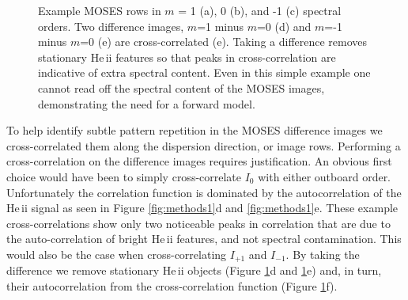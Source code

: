 \begin{figure}
 	 		\caption{Example MOSES rows in $m$ = 1 (a), 0 (b), and -1 (c) spectral orders.  Two difference images, $m$=1 minus $m$=0 (d) and $m$=-1 minus $m$=0 (e) are cross-correlated (e).  Taking a difference removes stationary He\,{\sc ii} features so that peaks in cross-correlation are indicative of extra spectral content.  Even in this simple example one cannot read off the spectral content of the MOSES images, demonstrating the need for a forward model.}
 	 		\label{fig:methods2}
 	 	\end{figure}
	
	 	To help identify subtle pattern repetition in the MOSES difference images we cross-correlated them along the dispersion direction, or image rows.   
	 	Performing a cross-correlation on the difference images requires justification.  
	 	An obvious first choice would have been to simply cross-correlate $I_0$ with either outboard order.  
	 	Unfortunately the correlation function is dominated by the autocorrelation of the He\,{\sc ii} signal as seen in Figure \ref{fig:methods1}d and \ref{fig:methods1}e.  
	 	These example cross-correlations show only two noticeable peaks in correlation that are due to the auto-correlation of bright He\,{\sc ii} features, and not spectral contamination.  
	 	This would also be the case when cross-correlating $I_{+1}$ and $I_{-1}$.  
	 	By taking the difference we remove stationary He\,{\sc ii} objects (Figure \ref{fig:methods2}d and \ref{fig:methods2}e) and, in turn, their autocorrelation from the cross-correlation function (Figure \ref{fig:methods2}f).
 	
